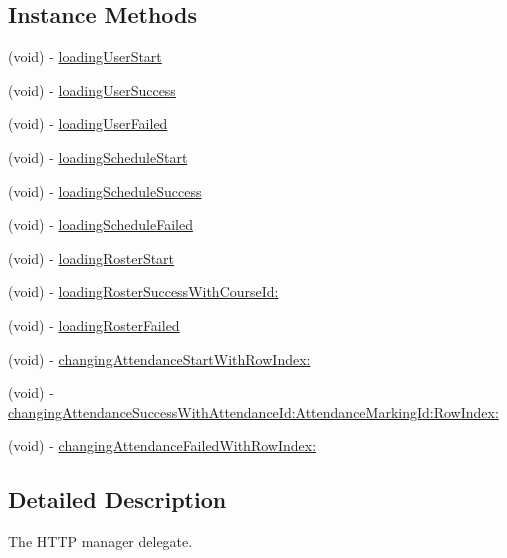 \subsection*{Instance Methods}
\begin{DoxyCompactItemize}
\item 
(void) -\/ \hyperlink{protocol_h_t_t_p_manager_delegate-p_a15b7cbca7478eeeea8e44c30dec70363}{loading\+User\+Start}
\item 
(void) -\/ \hyperlink{protocol_h_t_t_p_manager_delegate-p_a7f019b4b16362379e19ac046fcf70d6f}{loading\+User\+Success}
\item 
(void) -\/ \hyperlink{protocol_h_t_t_p_manager_delegate-p_aa55180501fad2aaec7d5985aa7034cb9}{loading\+User\+Failed}
\item 
(void) -\/ \hyperlink{protocol_h_t_t_p_manager_delegate-p_a17aed3c940fab56be60086cd63dd857c}{loading\+Schedule\+Start}
\item 
(void) -\/ \hyperlink{protocol_h_t_t_p_manager_delegate-p_ad040e1934c0748b336972aa9a0e45921}{loading\+Schedule\+Success}
\item 
(void) -\/ \hyperlink{protocol_h_t_t_p_manager_delegate-p_a23da4326fa82d5b0b78715b73ff26d9e}{loading\+Schedule\+Failed}
\item 
(void) -\/ \hyperlink{protocol_h_t_t_p_manager_delegate-p_a603f6b04ea5070de1b2945e80d965ed8}{loading\+Roster\+Start}
\item 
(void) -\/ \hyperlink{protocol_h_t_t_p_manager_delegate-p_aaa059c990a4a9cf66a5ea7fdc47b1a5f}{loading\+Roster\+Success\+With\+Course\+Id\+:}
\item 
(void) -\/ \hyperlink{protocol_h_t_t_p_manager_delegate-p_a8cdbefac0e7ed477ab9b5a6e520869e7}{loading\+Roster\+Failed}
\item 
(void) -\/ \hyperlink{protocol_h_t_t_p_manager_delegate-p_a4527736a908629a83e8d7d94a072a0c6}{changing\+Attendance\+Start\+With\+Row\+Index\+:}
\item 
(void) -\/ \hyperlink{protocol_h_t_t_p_manager_delegate-p_ac7ed46d7973315bd0d6dbf46f4cd47f1}{changing\+Attendance\+Success\+With\+Attendance\+Id\+:\+Attendance\+Marking\+Id\+:\+Row\+Index\+:}
\item 
(void) -\/ \hyperlink{protocol_h_t_t_p_manager_delegate-p_a96a3021d728a65c8a95b404df164dbbd}{changing\+Attendance\+Failed\+With\+Row\+Index\+:}
\end{DoxyCompactItemize}


\subsection{Detailed Description}
The H\+T\+T\+P manager delegate. 

